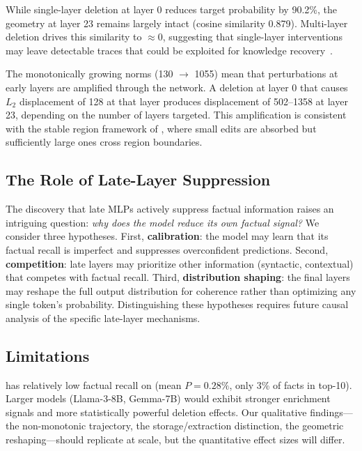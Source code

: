  While single-layer deletion at layer 0 reduces target probability by 90.2\%, the \residstream geometry at layer 23 remains largely intact (cosine similarity 0.879). Multi-layer deletion drives this similarity to $\approx 0$, suggesting that single-layer interventions may leave detectable traces that could be exploited for knowledge recovery~\citep{ghosh2024mechanistic}.

 The monotonically growing norms (130 $\to$ 1055) mean that perturbations at early layers are amplified through the network. A deletion at layer 0 that causes $L_2$ displacement of 128 at that layer produces displacement of 502--1358 at layer 23, depending on the number of layers targeted. This amplification is consistent with the stable region framework of \citet{janiak2024stable}, where small edits are absorbed but sufficiently large ones cross region boundaries.

\subsection{The Role of Late-Layer Suppression}
\label{sec:suppression}

The discovery that late MLPs actively suppress factual information raises an intriguing question: \emph{why does the model reduce its own factual signal?} We consider three hypotheses. First, \textbf{calibration}: the model may learn that its factual recall is imperfect and suppresses overconfident predictions. Second, \textbf{competition}: late layers may prioritize other information (syntactic, contextual) that competes with factual recall. Third, \textbf{distribution shaping}: the final layers may reshape the full output distribution for coherence rather than optimizing any single token's probability. Distinguishing these hypotheses requires future causal analysis of the specific late-layer mechanisms.

\subsection{Limitations}
\label{sec:limitations}

 \gptmed has relatively low factual recall on \counterfact (mean $P = 0.28\%$, only 3\% of facts in top-10). Larger models (\eg Llama-3-8B, Gemma-7B) would exhibit stronger enrichment signals and more statistically powerful deletion effects. Our qualitative findings---the non-monotonic trajectory, the storage/extraction distinction, the geometric reshaping---should replicate at scale, but the quantitative effect sizes will differ.

